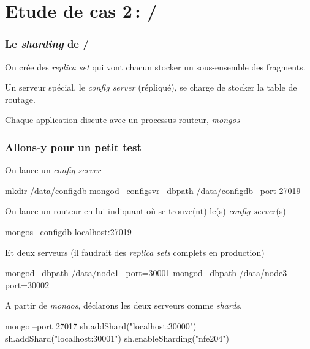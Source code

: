 \section{Etude de cas 2\,: \mongodb/}

 
\begin{frame}
\frametitle{Le \textit{sharding} de \mongodb/}

On crée des \textit{replica set} qui vont chacun stocker un sous-ensemble des fragments.

\vfill

Un serveur spécial, le \textit{config server} (répliqué), se charge de stocker la table de routage.

\vfill

Chaque application discute avec un processus routeur, \textit{mongos} 

\vfill



\end{frame}



\begin{frame}[fragile]
\frametitle{Allons-y pour un petit test}

On lance un \textit{config server}

\begin{smallverbatim}
mkdir /data/configdb
mongod --configsvr --dbpath /data/configdb --port 27019
\end{smallverbatim}

On lance un routeur en lui indiquant où se trouve(nt) le(s) \textit{config server}(s)

\begin{smallverbatim}
mongos --configdb localhost:27019
\end{smallverbatim}

Et deux serveurs (il faudrait des \textit{replica sets} complets en production)
\begin{smallverbatim}
mongod --dbpath /data/node1 --port=30001
mongod --dbpath /data/node3 --port=30002
\end{smallverbatim}

A partir de \textit{mongos}, déclarons les deux serveurs comme \textit{shards}.

\begin{smallverbatim}
mongo --port 27017
sh.addShard("localhost:30000")
sh.addShard("localhost:30001")
sh.enableSharding("nfe204")
\end{smallverbatim}

\end{frame}

